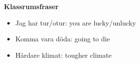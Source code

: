 
\begin{flushleft}
    \textbf{Klassrumsfraser}
    \begin{itemize}
        \item Jag har tur/otur: you are lucky/unlucky
        \item Komma vara döda: going to die
        \item Hårdare klimat: tougher climate
    \end{itemize}
\end{flushleft}

